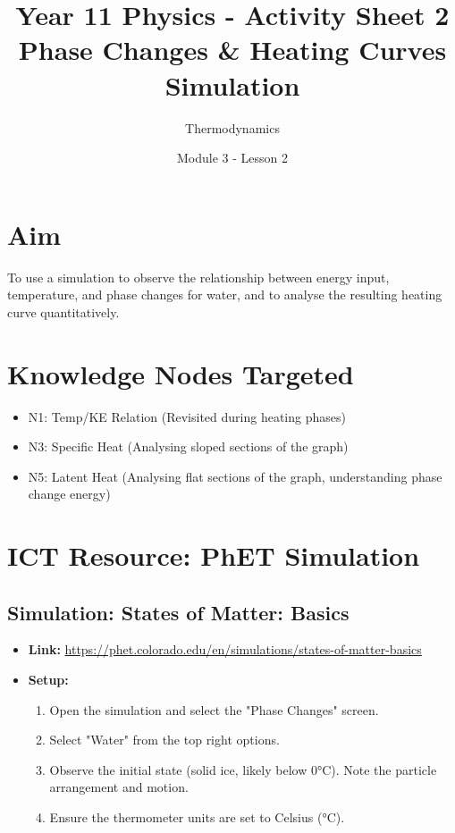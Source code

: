 \documentclass[11pt, a4paper]{article} %
\title{Year 11 Physics - Activity Sheet 2 \\ Phase Changes \& Heating Curves Simulation}
\date{Module 3 - Lesson 2}
\author{Thermodynamics}
\begin{document}
\maketitle

\section*{Aim}
To use a simulation to observe the relationship between energy input, temperature, and phase changes for water, and to analyse the resulting heating curve quantitatively.

\section*{Knowledge Nodes Targeted}
\begin{itemize}
    \item N1: Temp/KE Relation (Revisited during heating phases)
    \item N3: Specific Heat (Analysing sloped sections of the graph)
    \item N5: Latent Heat (Analysing flat sections of the graph, understanding phase change energy)
\end{itemize}

\section*{ICT Resource: PhET Simulation}

\subsection*{Simulation: States of Matter: Basics}
\begin{itemize}
    \item \textbf{Link:} \href{https://phet.colorado.edu/en/simulations/states-of-matter-basics}{https://phet.colorado.edu/en/simulations/states-of-matter-basics}
    \item \textbf{Setup:}
        \begin{enumerate}
        \item Open the simulation and select the "Phase Changes" screen.
        \item Select "Water" from the top right options.
        \item Observe the initial state (solid ice, likely below 0°C). Note the particle arrangement and motion.
        \item Ensure the thermometer units are set to Celsius (°C).
        \end{enumerate}
\end{itemize}
\end{document}
